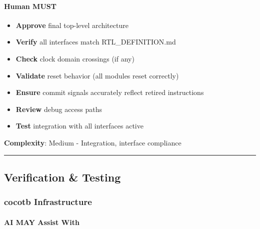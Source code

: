 \paragraph{\texorpdfstring{\hold{} Human MUST}{ Human MUST}}\label{cr:status:phase1-ai-human-responsibilities:raised-hand-human-must-9}

\begin{record}

\begin{itemize}
\tightlist
\item
  \textbf{Approve} final top-level architecture
\item
  \textbf{Verify} all interfaces match RTL\_\allowbreak{}DEFINITION.md
\item
  \textbf{Check} clock domain crossings (if any)
\item
  \textbf{Validate} reset behavior (all modules reset correctly)
\item
  \textbf{Ensure} commit signals accurately reflect retired instructions
\item
  \textbf{Review} debug access paths
\item
  \textbf{Test} integration with all interfaces active
\end{itemize}

\textbf{Complexity}: \partialmark{} Medium - Integration, interface
compliance

\begin{center}\rule{0.5\linewidth}{0.5pt}\end{center}

\end{record}

\subsection{Verification \& Testing}\label{cr:status:phase1-ai-human-responsibilities:verification-testing}

\subsubsection{cocotb Infrastructure}\label{cr:status:phase1-ai-human-responsibilities:cocotb-infrastructure}

\paragraph{\texorpdfstring{\ok{} AI MAY Assist
With}{ AI MAY Assist With}}\label{cr:status:phase1-ai-human-responsibilities:white-check-mark-ai-may-assist-with-10}


